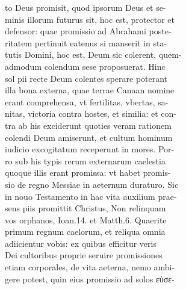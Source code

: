 \documentclass{article}
\begin{document}
\begin{pages}
                to Deus promisit, quod ipsorum Deus et se- \\
                minis illorum futurus sit, hoc est, protector et \\
                defensor: quae promissio ad Abrahami poste- \\
                ritatem pertinuit eatenus si manserit in sta- \\
                tutis Domini, hoc est, Deum sic colerent, quem- \\
                admodum colendum sese proposuerat. Hinc \\
                sol pii recte Deum colentes sperare poterant \\
                illa bona externa, quae terrae Canaan nomine \\
                erant comprehensa, vt fertilitas, vbertas, sa- \\
                nitas, victoria contra hostes, et similia: et con- \\
                tra ab his exciderunt quoties veram rationem \\
                colendi Deum amiserunt, et cultum hominum \\
                iudicio excogitatum receperunt in mores. Por- \\
                ro sub his typis rerum externarum caelestia \\
                quoque illis erant promissa: vt habet promis- \\
                sio de regno Messiae in aeternum duraturo. Sic \\
                in nouo Testamento in hac vita auxilium prae- \\
                sens piis promittit Christus, Non relinquam \\
                vos orphanos, Ioan.14. et Matth.6. Quaerite \\
                primum regnum caelorum, et reliqua omnia \\
                adiicientur vobis: ex quibus efficitur veris \\
                Dei cultoribus proprie seruire promissiones \\
                etiam corporales, de vita aeterna, nemo ambi- \\
                gere potest, quin eius promissio ad solos εὐσε- \\

\end{pages}
\end{document}
